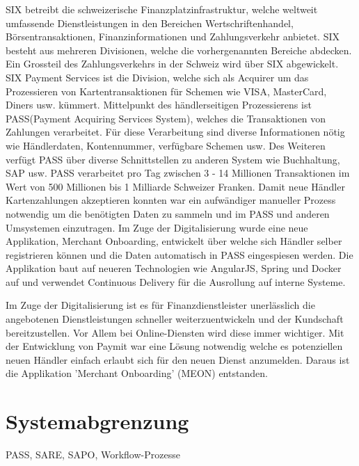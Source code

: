 SIX betreibt die schweizerische Finanzplatzinfrastruktur, welche weltweit umfassende Dienstleistungen in den Bereichen Wertschriftenhandel, Börsentransaktionen, Finanzinformationen und Zahlungsverkehr anbietet. SIX besteht aus mehreren Divisionen, welche die vorhergenannten Bereiche abdecken. Ein Grossteil des Zahlungsverkehrs in der Schweiz wird über SIX abgewickelt. 
SIX Payment Services ist die Division, welche sich als Acquirer um das Prozessieren von Kartentransaktionen für Schemen wie VISA, MasterCard, Diners usw. kümmert. Mittelpunkt des händlerseitigen Prozessierens ist PASS(Payment Acquiring Services System), welches die Transaktionen von Zahlungen verarbeitet. Für diese Verarbeitung sind diverse Informationen nötig wie Händlerdaten, Kontennummer, verfügbare Schemen usw. Des Weiteren verfügt PASS über diverse Schnittstellen zu anderen System wie Buchhaltung, SAP usw. PASS verarbeitet pro Tag zwischen 3 - 14 Millionen Transaktionen im Wert von 500 Millionen bis 1 Milliarde Schweizer Franken.
Damit neue Händler Kartenzahlungen akzeptieren konnten war ein aufwändiger manueller Prozess notwendig um die benötigten Daten zu sammeln und im PASS und anderen Umsystemen einzutragen. Im Zuge der Digitalisierung wurde eine neue Applikation, Merchant Onboarding, entwickelt über welche sich Händler selber registrieren können und die Daten automatisch in PASS eingespiesen werden.
Die Applikation baut auf neueren Technologien wie AngularJS, Spring und Docker auf und verwendet Continuous Delivery für die Ausrollung auf interne Systeme.


Im Zuge der Digitalisierung ist es für Finanzdienstleister unerlässlich die angebotenen Dienstleistungen schneller weiterzuentwickeln und der Kundschaft bereitzustellen. Vor Allem bei Online-Diensten wird diese immer wichtiger. Mit der Entwicklung von Paymit war eine Lösung notwendig welche es potenziellen neuen Händler einfach erlaubt sich für den neuen Dienst anzumelden.
Daraus ist die Applikation 'Merchant Onboarding' (MEON) entstanden. 

\section{Systemabgrenzung}

PASS, SARE, SAPO, Workflow-Prozesse

